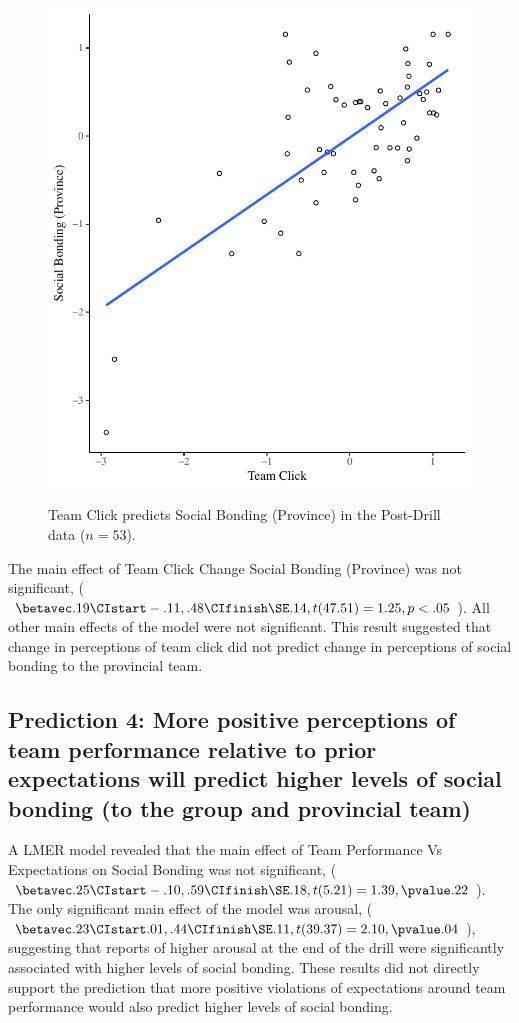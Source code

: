 \begin{CJK}{UTF8}{gbsn}
\begin{figure}
  \centering
    \includegraphics[width=0.5\linewidth,keepaspectratio] {images/groupClickTeamBondScatter}
    \label{fig:groupClickTeamBondScatter}
    \caption{Team Click predicts Social Bonding (Province) in the Post-Drill data ($n = 53$).}
\end{figure}


The main effect of Team Click Change Social Bonding (Province) was not significant, ($\betavec .19 \CIstart -.11, .48 \CIfinish \SE .14, t(47.51) = 1.25, p < .05$).  All other main effects of the model were not significant. This result suggested that change in perceptions of team click did not predict change in perceptions of social bonding to the provincial team.



\subsection{Prediction 4: More positive perceptions of team performance relative to prior expectations will predict higher levels of social bonding (to the group and provincial team)}



A LMER model revealed that the main effect of Team Performance Vs Expectations on Social Bonding was not significant, ($\betavec .25 \CIstart -.10, .59 \CIfinish \SE .18, t(5.21) = 1.39, \pvalue .22$).  The only significant main effect of the model was arousal, ($\betavec .23 \CIstart .01, .44 \CIfinish \SE .11, t(39.37) = 2.10, \pvalue .04$), suggesting that reports of higher arousal at the end of the drill were significantly associated with higher levels of social bonding.  These results did not directly support the prediction that more positive violations of expectations around team performance would also predict higher levels of social bonding.


\end{CJK}
